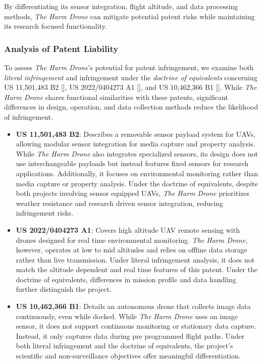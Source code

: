 \documentclass[12pt]{article}
\begin{document}
\par By differentiating its sensor integration, flight altitude, and data processing methods, \textit{The Harm Drone} can mitigate potential patent risks while maintaining its research focused functionality.

\subsubsection{Analysis of Patent Liability}

\par To assess \textit{The Harm Drone}'s potential for patent infringement, we examine both \textit{literal infringement} and infringement under the \textit{doctrine of equivalents} concerning US 11,501,483 B2 [], US 2022/0404273 A1 [], and US 10,462,366 B1 []. While \textit{The Harm Drone} shares functional similarities with these patents, significant differences in design, operation, and data collection methods reduce the likelihood of infringement.

\begin{itemize}
    \item \textbf{US 11,501,483 B2}: Describes a removable sensor payload system for UAVs, allowing modular sensor integration for media capture and property analysis. While \textit{The Harm Drone} also integrates specialized sensors, its design does not use interchangeable payloads but instead features fixed sensors for research applications. Additionally, it focuses on environmental monitoring rather than media capture or property analysis. Under the doctrine of equivalents, despite both projects involving sensor equipped UAVs, \textit{The Harm Drone} prioritizes weather resistance and research driven sensor integration, reducing infringement risks.

    \item \textbf{US 2022/0404273 A1}: Covers high altitude UAV remote sensing with drones designed for real time environmental monitoring. \textit{The Harm Drone}, however, operates at low to mid altitudes and relies on offline data storage rather than live transmission. Under literal infringement analysis, it does not match the altitude dependent and real time features of this patent. Under the doctrine of equivalents, differences in mission profile and data handling further distinguish the project.

    \item \textbf{US 10,462,366 B1}: Details an autonomous drone that collects image data continuously, even while docked. While \textit{The Harm Drone} uses an image sensor, it does not support continuous monitoring or stationary data capture. Instead, it only captures data during pre programmed flight paths. Under both literal infringement and the doctrine of equivalents, the project's scientific and non-surveillance objectives offer meaningful differentiation.
\end{itemize}
\end{document}
